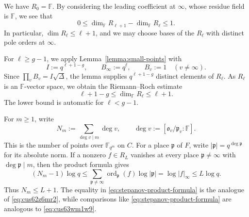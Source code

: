 \documentclass[reqno]{amsart} 
\begin{document}
We have $R_0=\mathbb{F}$.  By considering the leading coefficient at $\infty$, whose residue field is $\mathbb{F}$, we see that
\begin{equation*}
  0\leq\dim_{\mathbb{F}}R_{\ell+1}-\dim_{\mathbb{F}}R_\ell\leq1.
\end{equation*}
In particular, $\dim R_\ell\leq\ell+1$, and we may choose bases of the $R_\ell$ with distinct pole orders at $\infty$.

For $\ell\geq g-1$, we apply Lemma~\ref{lemma:small-points} with
\begin{equation*}
  I:=q^{\ell+1-g},\qquad B_\infty:=q^\ell,
  \qquad B_v:=1\quad(v\ne\infty).
\end{equation*}
Since $\prod_v B_v=I\sqrt\Delta$, the lemma supplies $q^{\ell+1-g}$ distinct elements of $R_\ell$.  As $R_\ell$ is an $\mathbb{F}$-vector space, we obtain the Riemann--Roch estimate
\begin{equation}\label{eq:stepanov-dimensions}
  \ell+1-g\leq\dim_{\mathbb{F}}R_\ell\leq\ell+1.
\end{equation}
The lower bound is automatic for $\ell<g-1$.

For $m\geq1$, write
\begin{equation*}
  N_m:=\sum_{\deg v\mid m}\deg v,
  \qquad \deg v:=[\mathfrak{o}_v/\mathfrak{p}_v:\mathbb{F}].
\end{equation*}
This is the number of points over $\mathbb{F}_{q^m}$ on $C$.  For a place $\mathfrak{p}$ of $F$, write $|\mathfrak{p}|=q^{\deg\mathfrak{p}}$ for its absolute norm.  If a nonzero $f\in R_L$ vanishes at every place $\mathfrak{p}\ne\infty$ with $\deg\mathfrak{p}\mid m$, then the product formula gives
\begin{equation}\label{eq:stepanov-product-formula}
  (N_m-1)\log q
  \leq \sum_{\mathfrak p\ne\infty}
  \operatorname{ord}_{\mathfrak p}(f)\log|\mathfrak p|
  =\log|f|_\infty
  \leq L\log q.
\end{equation}
Thus $N_m\leq L+1$.  The equality in \eqref{eq:stepanov-product-formula} is the analogue of \eqref{eq:cus62z6mr2}, while comparisons like \eqref{eq:stepanov-product-formula} are analogous to \eqref{eq:cus63wm1w9}.
\end{document}
